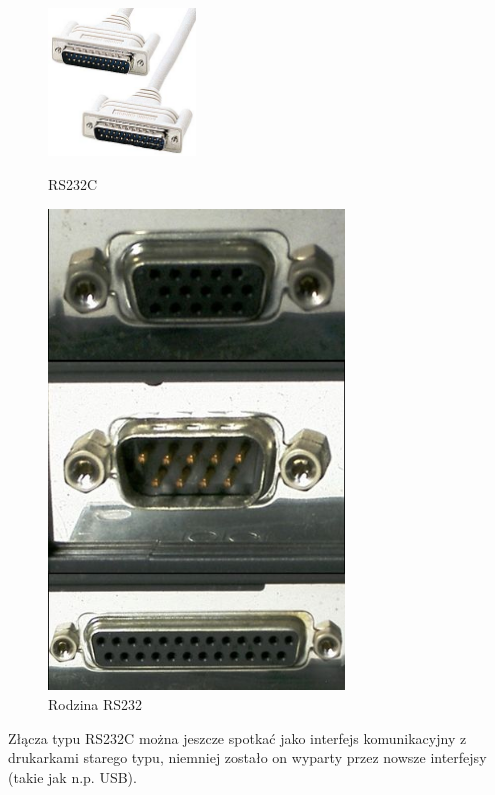 \documentclass{BscUS}
\begin{document}
\begin{figure}[H]
\centering
\parbox{5cm}{
\includegraphics[width=0.35\textwidth]{./img/rs232C}
\caption{RS232C \cite{RS232C}}
\label{fig:RS232C}}
\qquad
\begin{minipage}{5cm}
\centering
\includegraphics[width=0.7\textwidth]{./img/rs232family}
\caption{Rodzina RS232 \cite{RS232family}}
\label{fig:RS232Family}
\end{minipage}
\end{figure}
\noindent Złącza typu RS232C można jeszcze spotkać jako interfejs komunikacyjny z drukarkami starego typu, niemniej zostało on wyparty przez nowsze interfejsy (takie jak n.p. USB). \\
\end{document}
